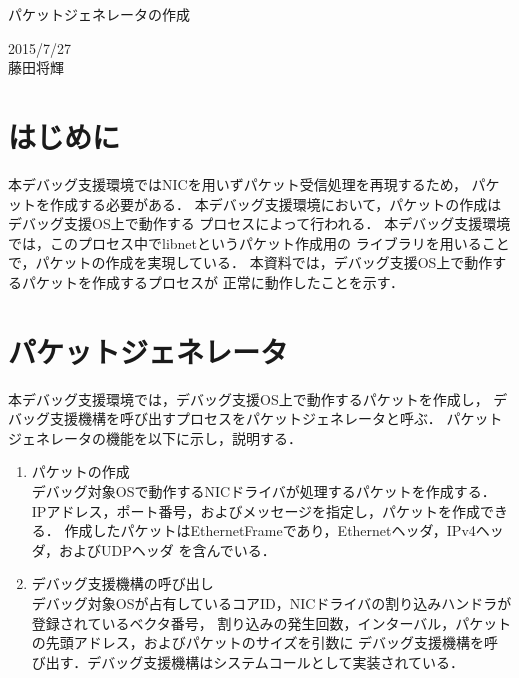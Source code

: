 \documentclass[12pt]{jsarticle}
\begin{document}

\begin{center}
    {\LARGE パケットジェネレータの作成}
\end{center}

\begin{flushright}
  2015/7/27\\
  藤田将輝
\end{flushright}
\section{はじめに}
本デバッグ支援環境ではNICを用いずパケット受信処理を再現するため，
パケットを作成する必要がある．
本デバッグ支援環境において，パケットの作成はデバッグ支援OS上で動作する
プロセスによって行われる．
本デバッグ支援環境では，このプロセス中でlibnetというパケット作成用の
ライブラリを用いることで，パケットの作成を実現している．
本資料では，デバッグ支援OS上で動作するパケットを作成するプロセスが
正常に動作したことを示す．
\section{パケットジェネレータ}
本デバッグ支援環境では，デバッグ支援OS上で動作するパケットを作成し，
デバッグ支援機構を呼び出すプロセスをパケットジェネレータと呼ぶ．
パケットジェネレータの機能を以下に示し，説明する．
\begin{enumerate}
    \item パケットの作成\\
        デバッグ対象OSで動作するNICドライバが処理するパケットを作成する．
        IPアドレス，ポート番号，およびメッセージを指定し，パケットを作成できる．
        作成したパケットはEthernetFrameであり，Ethernetヘッダ，IPv4ヘッダ，およびUDPヘッダ
        を含んでいる．
    \item デバッグ支援機構の呼び出し\\
        デバッグ対象OSが占有しているコアID，NICドライバの割り込みハンドラが登録されているベクタ番号，
        割り込みの発生回数，インターバル，パケットの先頭アドレス，およびパケットのサイズを引数に
        デバッグ支援機構を呼び出す．デバッグ支援機構はシステムコールとして実装されている．
\end{enumerate}
\end{document}
